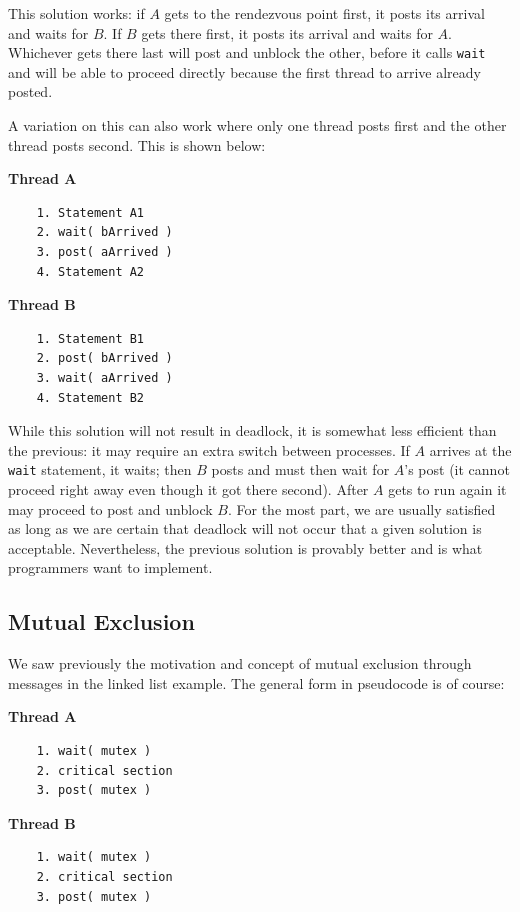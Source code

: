 \documentclass[a4paper]{report}
\begin{document}
This solution works: if $A$ gets to the rendezvous point first, it posts its arrival and waits for $B$. If $B$ gets there first, it posts its arrival and waits for $A$. Whichever gets there last will post and unblock the other, before it calls \texttt{wait} and will be able to proceed directly because the first thread to arrive already posted.

A variation on this can also work where only one thread posts first and the other thread posts second. This is shown below:

\begin{multicols}{2}
	\textbf{Thread A}\vspace{-2em}
	\begin{verbatim}
	1. Statement A1
	2. wait( bArrived )
	3. post( aArrived )
	4. Statement A2
  \end{verbatim}
	\columnbreak
	\textbf{Thread B}\vspace{-2em}
	\begin{verbatim}
	1. Statement B1
	2. post( bArrived )
	3. wait( aArrived )
	4. Statement B2
  \end{verbatim}
\end{multicols}
\vspace{-2em}

While this solution will not result in deadlock, it is somewhat less efficient than the previous: it may require an extra switch between processes. If $A$ arrives at the \texttt{wait} statement, it waits; then $B$ posts and must then wait for $A$'s post (it cannot proceed right away even though it got there second). After $A$ gets to run again it may proceed to post and unblock $B$. For the most part, we are usually satisfied as long as we are certain that deadlock will not occur that a given solution is acceptable. Nevertheless, the previous solution is provably better and is what programmers want to implement.

\subsection*{Mutual Exclusion}
We saw previously the motivation and concept of mutual exclusion through messages in the linked list example. The general form in pseudocode is of course:

\begin{multicols}{2}
	\textbf{Thread A}\vspace{-2em}
	\begin{verbatim}
	1. wait( mutex )
	2. critical section
	3. post( mutex )
  \end{verbatim}
	\columnbreak
	\textbf{Thread B}\vspace{-2em}
	\begin{verbatim}
	1. wait( mutex )
	2. critical section
	3. post( mutex )
  \end{verbatim}
\end{multicols}
\vspace{-2em}
\end{document}
